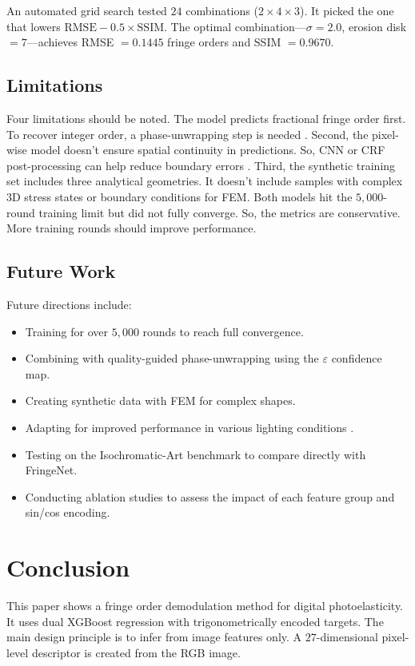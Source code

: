 \documentclass[review,12pt]{elsarticle}
\begin{document}
An automated grid search tested $24$ combinations ($2 \times 4 \times 3$). It picked the one that lowers $\mathrm{RMSE} - 0.5 \times \mathrm{SSIM}$. The optimal combination---$\sigma = 2.0$, erosion disk $= 7$---achieves RMSE $= 0.1445$ fringe orders and SSIM $= 0.9670$.

\subsection{Limitations}

Four limitations should be noted. The model predicts fractional fringe order first. To recover integer order, a phase-unwrapping step is needed \cite{ramesh2004,ramji2008}. Second, the pixel-wise model doesn't ensure spatial continuity in predictions. So, CNN or CRF post-processing can help reduce boundary errors \cite{mohan2024,brinezdeleon2024}. Third, the synthetic training set includes three analytical geometries. It doesn't include samples with complex 3D stress states or boundary conditions for FEM. Both models hit the $5{,}000$-round training limit but did not fully converge. So, the metrics are conservative. More training rounds should improve performance.

\subsection{Future Work}

Future directions include:

\begin{itemize}
\item Training for over $5{,}000$ rounds to reach full convergence.
\item Combining with quality-guided phase-unwrapping \cite{ramji2010,ramesh2004} using the $\varepsilon$ confidence map.
\item Creating synthetic data with FEM for complex shapes.
\item Adapting for improved performance in various lighting conditions \cite{brinezdeleon2024}.
\item Testing on the Isochromatic-Art benchmark \cite{mohan2024} to compare directly with FringeNet.
\item Conducting ablation studies to assess the impact of each feature group and sin/cos encoding.
\end{itemize}

\FloatBarrier
\section{Conclusion}
\label{sec:conclusion}
This paper shows a fringe order demodulation method for digital photoelasticity. It uses dual XGBoost regression with trigonometrically encoded targets. The main design principle is to infer from image features only. A $27$-dimensional pixel-level descriptor is created from the RGB image.
\end{document}

